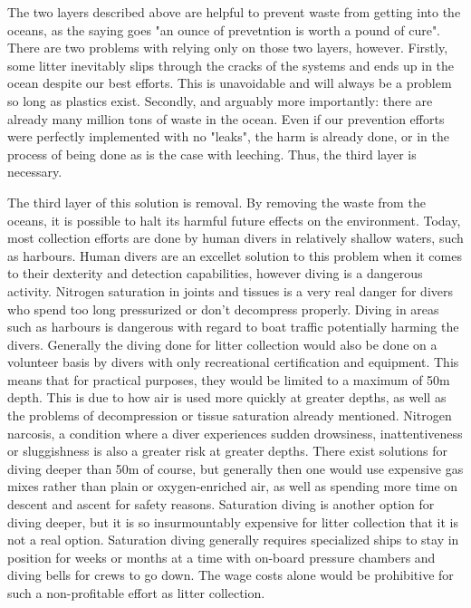 \documentclass[class=article, crop=false]{standalone}
\begin{document}
The two layers described above are helpful to prevent waste from getting into the oceans, as the saying goes "an ounce of prevetntion is worth a pound of cure". There are two problems with relying only on those two layers, however. Firstly, some litter inevitably slips through the cracks of the systems and ends up in the ocean despite our best efforts. This is unavoidable and will always be a problem so long as plastics exist. Secondly, and arguably more importantly: there are already many million tons of waste in the ocean. Even if our prevention efforts were perfectly implemented with no "leaks", the harm is already done, or in the process of being done as is the case with leeching. Thus, the third layer is necessary.

The third layer of this solution is removal. By removing the waste from the oceans, it is possible to halt its harmful future effects on the environment. Today, most collection efforts are done by human divers in relatively shallow waters, such as harbours. Human divers are an excellet solution to this problem when it comes to their dexterity and detection capabilities, however diving is a dangerous activity. Nitrogen saturation in joints and tissues is a very real danger for divers who spend too long pressurized or don't decompress properly. Diving in areas such as harbours is dangerous with regard to boat traffic potentially harming the divers. Generally the diving done for litter collection would also be done on a volunteer basis by divers with only recreational certification and equipment. This means that for practical purposes, they would be limited to a maximum of 50m depth. This is due to how air is used more quickly at greater depths, as well as the problems of decompression or tissue saturation already mentioned. Nitrogen narcosis, a condition where a diver experiences sudden drowsiness, inattentiveness or sluggishness is also a greater risk at greater depths. There exist solutions for diving deeper than 50m of course, but generally then one would use expensive gas mixes rather than plain or oxygen-enriched air, as well as spending more time on descent and ascent for safety reasons. Saturation diving is another option for diving deeper, but it is so insurmountably expensive for litter collection that it is not a real option. Saturation diving generally requires specialized ships to stay in position for weeks or months at a time with on-board pressure chambers and diving bells for crews to go down. The wage costs alone would be prohibitive for such a non-profitable effort as litter collection.
\end{document}
